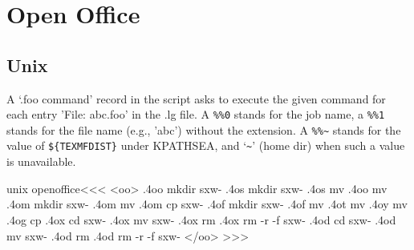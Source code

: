 \documentclass{article}
\begin{document}
\section{Open Office}



\subsection{Unix}


A `.foo command' record in the script asks to execute the given 
command for each entry 'File: abc.foo' in the .lg file.  A \verb=%%0=
stands for the job name, a \verb=%%1= stands for the file name
(e.g., 'abc') without  the extension. A \verb=%%~= stands for the
value  of \verb=${TEXMFDIST}= under KPATHSEA, and `\verb=~=' (home dir)
when such a value is unavailable.


\<unix openoffice\><<<
<oo>
.4oo mkdir sxw-%
.4os mkdir sxw-%
.4os mv    %
.4oo mv    %
.4om mkdir sxw-%
.4om mv    %
.4om cp    sxw-%
.4of mkdir sxw-%
.4of mv    %
.4ot mv    %
.4oy mv    %
.4og cp    %
.4ox cd sxw-%
.4ox mv    sxw-%
.4ox rm    %
.4ox rm -r -f sxw-%
.4od cd sxw-%
.4od mv    sxw-%
.4od rm    %
.4od rm -r -f sxw-%
</oo>
>>>
\end{document}
